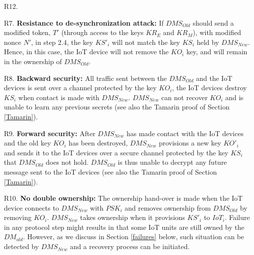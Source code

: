 {\begin{labeling}{R12.}
\item [R7.] \textbf{Resistance to de-synchronization attack:} %
If $DMS_{Old}$ should send a modified token, $T'$ (through access to the keys $KR_E$ and $KR_M$), with modified nonce $N'$, in step 2.4, the key $KS'_i$ will not match the key $KS_i$ held by $DMS_{New}$. Hence, in this case, the IoT device will not remove the $KO_i$ key, and will remain in the ownership of $DMS_{Old}$.
\item [R8.] \textbf{Backward security:} %
All traffic sent between the $DMS_{Old}$ and the IoT devices is sent over a channel protected by the key $KO_i$, the IoT devices destroy $KS_i$ when contact is made with $DMS_{New}$. $DMS_{New}$ can not recover $KO_i$ and is unable to learn any previous secrets (see also the Tamarin proof of Section \ref{Tamarin}).
\item [R9.] \textbf{Forward security:} %
After $DMS_{New}$ has made contact with the IoT devices and the old key $KO_i$ has been destroyed, $DMS_{New}$ provisions a new key $KO'_i$ and sends it to the IoT devices over a secure channel protected by the key $KS_i$ that $DMS_{Old}$ does not hold. $DMS_{Old}$ is thus unable to decrypt any future message sent to the IoT devices  (see also the Tamarin proof of Section \ref{Tamarin}).
 \item [R10.] \textbf{No double ownership:} %
 The ownership hand-over is made when the IoT device connects to $DMS_{New}$ with $PSK_i$ and removes ownership from $DMS_{Old}$ by removing $KO_i$. $DMS_{New}$ takes ownership when it provisions $KS'_i$ to $IoT_i$. Failure in any protocol step might results in that some IoT units are still owned by the $DM_{old}$. However, as we discuss in Section \ref{failures} below, such situation can be detected by $DMS_{New}$ and a recovery process can be initiated.

\end{labeling}}
